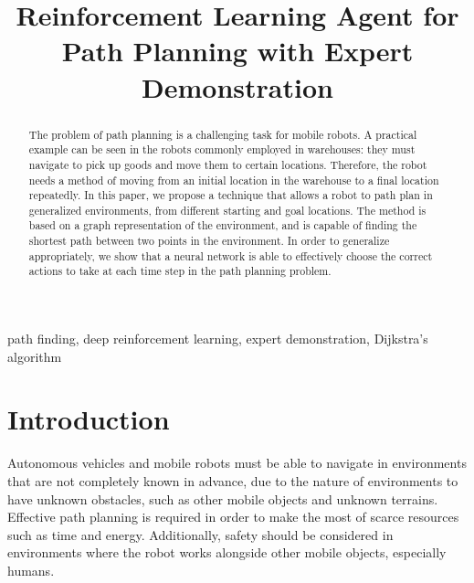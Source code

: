 \documentclass[conference]{IEEEtran}
\begin{document}
\title{Reinforcement Learning Agent for Path Planning with Expert Demonstration}

\author{%

}

\maketitle
\begin{abstract}
    The problem of path planning is a challenging task for mobile robots. A
    practical example can be seen in the robots commonly employed in warehouses:
    they must navigate to pick up goods and move them to certain locations.
    Therefore, the robot needs a method of moving from an initial location in
    the warehouse to a final location repeatedly. In this paper, we propose a
    technique that allows a robot to path plan in generalized environments, from
    different starting and goal locations. The method is based on a graph
    representation of the environment, and is capable of finding the shortest
    path between two points in the environment. In order to generalize
    appropriately, we show that a neural network is able to effectively choose
    the correct actions to take at each time step in the path planning problem.
\end{abstract}

\begin{IEEEkeywords}
    path finding, deep reinforcement learning, expert demonstration, Dijkstra's
    algorithm
\end{IEEEkeywords}

\section{Introduction}
Autonomous vehicles and mobile robots must be able to navigate in environments
that are not completely known in advance, due to the nature of environments to
have unknown obstacles, such as other mobile objects and unknown terrains.
Effective path planning is required in order to make the most of scarce
resources such as time and energy. Additionally, safety should be considered in
environments where the robot works alongside other mobile objects, especially
humans.
\end{document}
